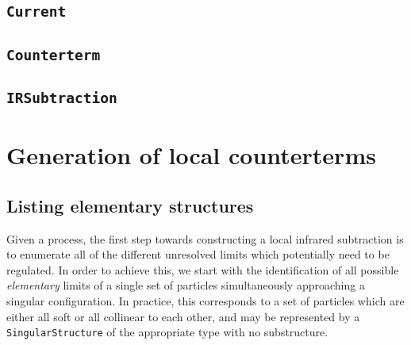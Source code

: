 \documentclass[11pt,a4paper]{article}
\newcommand{\py}[1]{\lstinline[language=python]{#1}}
\begin{document}
\subsection{\py{Current}}


\subsection{\py{Counterterm}}


\subsection{\py{IRSubtraction}}


\section{Generation of local counterterms}
\label{sec:generation}

\subsection{Listing elementary structures}
\label{ssec:elementary}

Given a process, the first step towards constructing
a local infrared subtraction is to enumerate
all of the different unresolved limits which potentially need to be regulated.
In order to achieve this, we start with the identification of all possible
\emph{elementary} limits of a single set of particles
simultaneously approaching a singular configuration.
In practice, this corresponds to a set of particles
which are either all soft or all collinear to each other,
and may be represented by a \py{SingularStructure} of the appropriate type
with no substructure.
\end{document}
